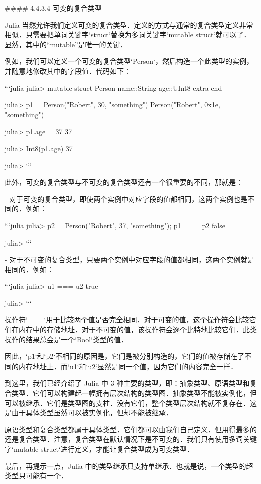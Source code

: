 #### 4.4.3.4 可变的复合类型

Julia 当然允许我们定义可变的复合类型．定义的方式与通常的复合类型定义非常相似．只需要把单词关键字`struct`替换为多词关键字`mutable struct`就可以了．显然，其中的“mutable”是唯一的关键．

例如，我们可以定义一个可变的复合类型`Person`，然后构造一个此类型的实例，并随意地修改其中的字段值．代码如下：

```julia
julia> mutable struct Person
           name::String
           age::UInt8
           extra
       end

julia> p1 = Person("Robert", 30, "something")
Person("Robert", 0x1e, "something")

julia> p1.age = 37
37

julia> Int8(p1.age)
37

julia> 
```

此外，可变的复合类型与不可变的复合类型还有一个很重要的不同，那就是：

- 对于可变的复合类型，即使两个实例中对应字段的值都相同，这两个实例也是不同的．例如：

  ```julia
  julia> p2 = Person("Robert", 37, "something"); p1 === p2
  false
  
  julia> 
  ```

- 对于不可变的复合类型，只要两个实例中对应字段的值都相同，这两个实例就是相同的．例如：

  ```julia
  julia> u1 === u2
  true
  
  julia> 
  ```

操作符`===`用于比较两个值是否完全相同．对于可变的值，这个操作符会比较它们在内存中的存储地址．对于不可变的值，该操作符会逐个比特地比较它们．此类操作的结果总会是一个`Bool`类型的值．

因此，`p1`和`p2`不相同的原因是，它们是被分别构造的，它们的值被存储在了不同的内存地址上．而`u1`和`u2`显然是同一个值，因为它们的内容完全一样．

到这里，我们已经介绍了 Julia 中 3 种主要的类型，即：抽象类型、原语类型和复合类型．它们可以构建起一幅拥有层次结构的类型图．抽象类型不能被实例化，但可以被继承．它们是类型图的支柱．没有它们，整个类型层次结构就不复存在．这是由于具体类型虽然可以被实例化，但却不能被继承．

原语类型和复合类型都属于具体类型．它们都可以由我们自己定义．但用得最多的还是复合类型．注意，复合类型在默认情况下是不可变的．我们只有使用多词关键字`mutable struct`进行定义，才能让复合类型成为可变类型．

最后，再提示一点，Julia 中的类型继承只支持单继承．也就是说，一个类型的超类型只可能有一个．